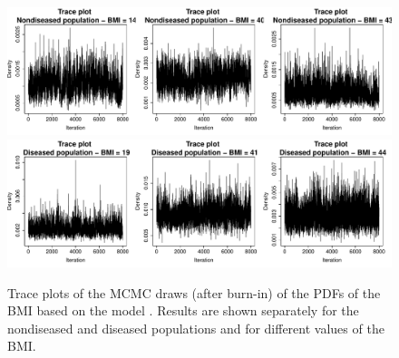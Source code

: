 \begin{figure}[ht!]
\begin{center}
\includegraphics[width=14cm]{trace_plot_dpm_healthy.pdf}
\includegraphics[width=14cm]{trace_plot_dpm_diseased.pdf}
\end{center}
\caption{Trace plots of the MCMC draws (after burn-in) of the PDFs of the BMI based on the model . Results are shown separately for the nondiseased and diseased populations and for different values of the BMI.}
\label{pROC_dpm_densities_tp}
\end{figure}
